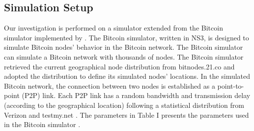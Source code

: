 \documentclass[10pt,journal,compsoc]{IEEEtran}
\begin{document}
\subsection{Simulation Setup}
Our investigation is performed on a simulator extended from the Bitcoin simulator implemented by \cite{gervais2016security}. The Bitcoin simulator, written in NS3, is designed to simulate Bitcoin nodes' behavior in the Bitcoin network. The Bitcoin simulator can simulate a Bitcoin network with thousands of nodes. The Bitcoin simulator retrieved the current geographical node distribution from bitnodes.21.co and adopted the distribution to define its simulated nodes' locations. In the simulated Bitcoin network, the connection between two nodes is established as a point-to-point (P2P) link. Each P2P link has a random bandwidth and transmission delay (according to the geographical location) following a statistical distribution from Verizon \cite{verizon} and testmy.net \cite{testmy}. The parameters in Table I presents the parameters used in the Bitcoin simulator \cite{gervais2016security}.
\end{document}
